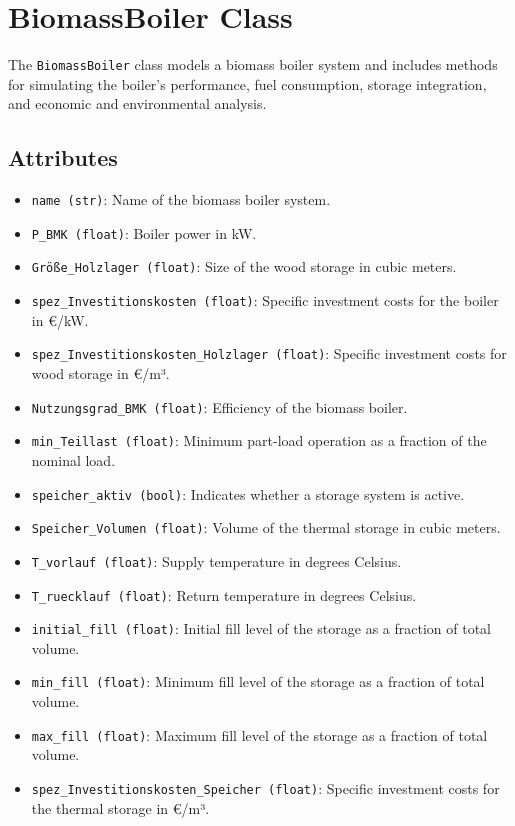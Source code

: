 \section{BiomassBoiler Class}
The \texttt{BiomassBoiler} class models a biomass boiler system and includes methods for simulating the boiler’s performance, fuel consumption, storage integration, and economic and environmental analysis.

\subsection{Attributes}
\begin{itemize}
    \item \texttt{name (str)}: Name of the biomass boiler system.
    \item \texttt{P\_BMK (float)}: Boiler power in kW.
    \item \texttt{Größe\_Holzlager (float)}: Size of the wood storage in cubic meters.
    \item \texttt{spez\_Investitionskosten (float)}: Specific investment costs for the boiler in €/kW.
    \item \texttt{spez\_Investitionskosten\_Holzlager (float)}: Specific investment costs for wood storage in €/m³.
    \item \texttt{Nutzungsgrad\_BMK (float)}: Efficiency of the biomass boiler.
    \item \texttt{min\_Teillast (float)}: Minimum part-load operation as a fraction of the nominal load.
    \item \texttt{speicher\_aktiv (bool)}: Indicates whether a storage system is active.
    \item \texttt{Speicher\_Volumen (float)}: Volume of the thermal storage in cubic meters.
    \item \texttt{T\_vorlauf (float)}: Supply temperature in degrees Celsius.
    \item \texttt{T\_ruecklauf (float)}: Return temperature in degrees Celsius.
    \item \texttt{initial\_fill (float)}: Initial fill level of the storage as a fraction of total volume.
    \item \texttt{min\_fill (float)}: Minimum fill level of the storage as a fraction of total volume.
    \item \texttt{max\_fill (float)}: Maximum fill level of the storage as a fraction of total volume.
    \item \texttt{spez\_Investitionskosten\_Speicher (float)}: Specific investment costs for the thermal storage in €/m³.

\end{itemize}
